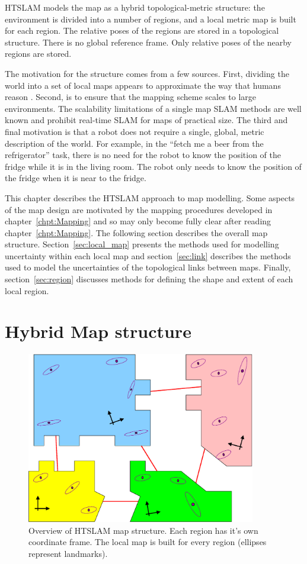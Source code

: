 HTSLAM models the map as a hybrid topological-metric structure: the
environment is divided into a number of regions, and a local metric
map is built for each region. The relative poses of the regions are
stored in a topological structure. There is no global reference
frame. Only relative poses of the nearby regions are stored.

The motivation for the structure comes from a few sources. First,
dividing the world into a set of local maps appears to approximate the
way that humans reason \cite{psycho_kuipers82}. Second, is to ensure
that the mapping scheme scales to large environments.  The scalability
limitations of a single map SLAM methods are well known
\cite{guivant03,guivant01,guivant02} and prohibit real-time SLAM for
maps of practical size.  The third and final motivation is that a
robot does not require a single, global, metric description of the
world.  For example, in the ``fetch me a beer from the refrigerator''
task, there is no need for the robot to know the position of the
fridge while it is in the living room.  The robot only needs to know
the position of the fridge when it is near to the fridge.

This chapter describes the HTSLAM approach to map modelling.  Some
aspects of the map design are motivated by the mapping procedures
developed in chapter~\ref{chpt:Mapping} and so may only become fully
clear after reading chapter~\ref{chpt:Mapping}. The following section
describes the overall map structure.  Section~\ref{sec:local_map}
presents the methods used for modelling uncertainty within each local
map and section~\ref{sec:link} describes the methods used to model the
uncertainties of the topological links between maps.  Finally,
section~\ref{sec:region} discusses methods for defining the shape and
extent of each local region.

\section{Hybrid Map structure}
\label{sec:HM_structure}

\begin{figure}
\begin{center}
\includegraphics[width=10cm]{Pics/fig_map_structure}
\end{center}
\caption{Overview of HTSLAM map structure. Each region has it's own
coordinate frame. The local map is built for every region (ellipses
represent landmarks). }
\label{fig:htslam_structure}
\end{figure}

